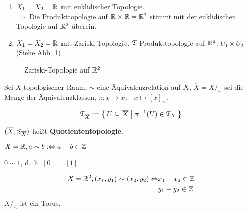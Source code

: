 \begin{beispiel}
    \begin{enumerate}[label=\arabic*)]
        \item $X_1 = X_2 = \mathbb{R}$ mit euklidischer Topologie.\\
              $\Rightarrow$ Die Produkttopologie auf $\mathbb{R} \times \mathbb{R} = \mathbb{R}^2$
              stimmt mit der euklidischen Topologie auf $\mathbb{R}^2$ überein.
        \item $X_1 = X_2 = \mathbb{R}$ mit Zariski-Topologie.
              $\mathfrak{T}$ Produkttopologie auf $\mathbb{R}^2$: $U_1 \times U_2$\\
              (Siehe Abb. \ref{fig:zariski-topologie})
    \end{enumerate}

    \begin{figure}[htp]
        \centering
        
        \caption{Zariski-Topologie auf $\mathbb{R}^2$}
        \label{fig:zariski-topologie}
    \end{figure}
\end{beispiel}

\begin{definition} 
    Sei $X$ topologischer Raum, $\sim$ eine Äquivalenzrelation auf $X$,
    $\overline{X} = X /_\sim$ sei die Menge der Äquivalenzklassen,
    $\pi: x \rightarrow \overline{x}, \;\;\; x \mapsto [x]_\sim$.

    \[\mathfrak{T}_{\overline{X}} := \Set{U \subseteq \overline{X} | \pi^{-1}(U) \in \mathfrak{T}_X}\]

    $(\overline{X}, \mathfrak{T}_{\overline{X}})$ heißt \textbf{Quotiententopologie}.
\end{definition}

\begin{beispiel}
    $X = \mathbb{R}, a \sim b :\Leftrightarrow a-b \in \mathbb{Z}$
    
    

    $0 \sim 1$, d.~h. $[0] = [1]$
\end{beispiel}

\begin{beispiel}
    \begin{align*}
        X = \mathbb{R}^2, (x_1, y_1) \sim (x_2, y_2) \Leftrightarrow &x_1 - x_2 \in \mathbb{Z}\\
                                                   &y_1 - y_2 \in \mathbb{Z}
    \end{align*}
    $X /_\sim$ ist ein Torus.
\end{beispiel}

